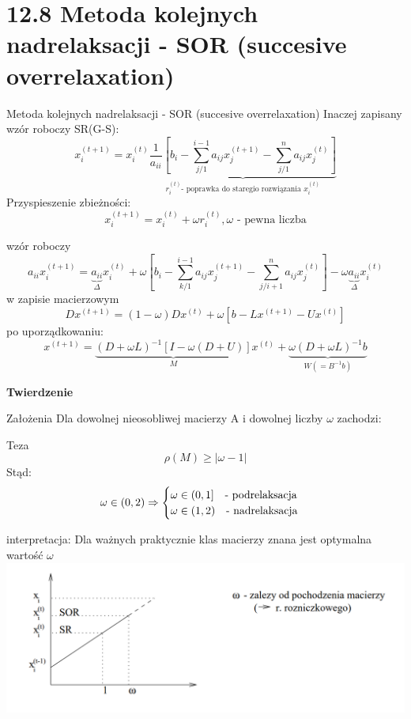 \section{12.8 Metoda kolejnych nadrelaksacji - SOR (succesive overrelaxation)}

\begin{frame}{Metoda kolejnych nadrelaksacji - SOR (succesive overrelaxation)}
  Inaczej zapisany wzór roboczy SR(G-S):
$$x^{(t+1)}_{i}=x^{(t)}_{i} \underbrace{\frac{1}{a_{ii}}[b_i-\sum^{i-1}_{j/1} a_{ij} x^{(t+1)}_j -\sum^{n}_{j/1} a_{ij} x^{(t)}_j ]}_{r^{(t)}_i \text{- poprawka do staregio rozwiązania } x^{(t)}_i}$$
  Przyspieszenie zbieżności:
  $$\boxed{x^{(t+1)}_{i}=x^{(t)}_{i}+\omega r^{(t)}_{i}}, \text{$\omega$ - pewna liczba}$$
\end{frame}

\begin{frame}
  wzór roboczy
  $$a_{ii}x^{(t+1)}_{i}=\underbrace{a_{ii}}_{\Delta}x^{(t)}_{i}+\omega[b_i-\sum^{i-1}_{k/1}a_{ij}x^{(t+1)}_{j}-\sum^{n}_{j/i+1}a_{ij}x^{(t)}_{j}]-\omega\underbrace{a_{ii}}_{\Delta}x^{(t)}_{i}$$
  w zapisie macierzowym
  $$Dx^{(t+1)}=(1-\omega )Dx^{(t)}+\omega [b-Lx^{(t+1)}-Ux^{(t)}]$$
  po uporządkowaniu:
  $$x^{(t+1)}=\underbrace{(D+\omega L)^{-1}[I-\omega (D+U)]}_{M}x^{(t)}+\underbrace{\omega(D+\omega L)^{-1}b}_{W(=B^{-1}b)}$$
\end{frame}

\begin{frame}{}
  \textbf{Twierdzenie}
  \begin{block}{Założenia}
    Dla dowolnej nieosobliwej macierzy A i dowolnej liczby $\omega$ zachodzi:
  \end{block}
  \begin{block}{Teza}
    $$\rho(M)\geq |\omega -1|$$
    Stąd:
    $$
    \omega\in(0,2) \Rightarrow
    \begin{cases}
      \omega\in{(0,1]}\text{\quad- podrelaksacja}\\
      \omega\in{(1,2)}\text{\quad- nadrelaksacja}
    \end{cases}
    $$
  \end{block}
\end{frame}

\begin{frame}{}
  interpretacja:
  Dla ważnych praktycznie klas macierzy znana jest optymalna wartość $\omega$
  \includegraphics[height=0.6\textheight, width=1\textwidth]{img/12/iteracja2}
\end{frame}


